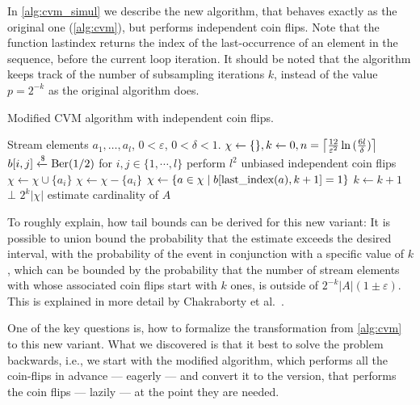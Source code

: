 In \cref{alg:cvm_simul} we describe the new algorithm, that behaves exactly as the original one (\cref{alg:cvm}), but performs independent coin flips.
Note that the function last{\textunderscore}index returns the index of the last-occurrence of an element in the sequence, before the current loop iteration.
It should be noted that the algorithm keeps track of the number of subsampling iterations $k$, instead of the value $p = 2^{-k}$ as the original algorithm does.
%
\begin{algorithm}[h!]
	\caption{Modified CVM algorithm with independent coin flips.}\label{alg:cvm_simul}
	\begin{algorithmic}[1]
  \Require Stream elements $a_1,\dots,a_l$, $0 < \varepsilon$, $0 < \delta < 1$.
  \State $\chi \gets \{\}, k \gets 0, n = \ceil*{\frac{12}{\varepsilon^2} \ln{(\frac{6l}{\delta})} }$
  \State $b[i,j] \getsr \Ber(1/2)$ for $i,j \in \{1,\cdots,l\}$ \Comment perform $l^2$ unbiased independent coin flips
      \State $\chi \gets \chi \cup \{a_i\}$
    \Else
      \State $\chi \gets \chi - \{a_i\}$
    \EndIf
      \State $\chi \gets \{a \in \chi \;|\; b[\textrm{last{\textunderscore}index}(a),k+1] = 1\}$
      \State $k \gets k+1$
    \EndIf
      \State \Return $\bot$
    \EndIf
  \EndFor
  \State \Return $2^k |\chi|$ \Comment estimate cardinality of $A$
  \end{algorithmic}
\end{algorithm}
To roughly explain, how tail bounds can be derived for this new variant:
It is possible to union bound the probability that the estimate exceeds the desired interval, with the probability of the event in conjunction with a specific value of $k$, which can be bounded by the probability that the number of stream elements with whose associated coin flips start with $k$ ones, is outside of $2^{-k} |A| (1 \pm \varepsilon)$.
This is explained in more detail by Chakraborty et al.~\cite{chakraborty2022}.

One of the key questions is, how to formalize the transformation from \cref{alg:cvm} to this new variant.
What we discovered is that it best to solve the problem backwards, i.e., we start with the modified algorithm, which performs all the coin-flips in advance --- eagerly --- and convert it to the version, that performs the coin flips --- lazily --- at the point they are needed.

